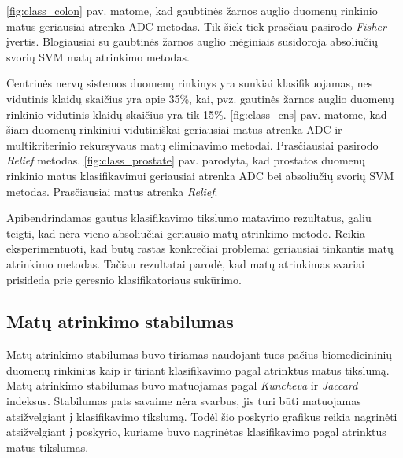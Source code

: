 \ref{fig:class_colon} pav. matome, kad gaubtinės žarnos auglio duomenų rinkinio matus geriausiai atrenka ADC metodas. Tik šiek tiek prasčiau pasirodo \textit{Fisher} įvertis. Blogiausiai su gaubtinės žarnos auglio mėginiais susidoroja absoliučių svorių SVM matų atrinkimo metodas.

Centrinės nervų sistemos duomenų rinkinys yra sunkiai klasifikuojamas, nes vidutinis klaidų skaičius yra apie 35\%, kai, pvz. gautinės žarnos auglio duomenų rinkinio vidutinis klaidų skaičius yra tik 15\%. \ref{fig:class_cns} pav. matome, kad šiam duomenų rinkiniui vidutiniškai geriausiai matus atrenka ADC ir multikriterinio rekursyvaus matų eliminavimo metodai. Prasčiausiai pasirodo \textit{Relief} metodas.
\ref{fig:class_prostate} pav. parodyta, kad prostatos duomenų rinkinio matus klasifikavimui geriausiai atrenka ADC bei absoliučių svorių SVM metodas. Prasčiausiai matus atrenka \textit{Relief}.

Apibendrindamas gautus klasifikavimo tikslumo matavimo rezultatus, galiu teigti, kad nėra vieno absoliučiai geriausio matų atrinkimo metodo. Reikia eksperimentuoti, kad būtų rastas konkrečiai problemai geriausiai tinkantis matų atrinkimo metodas. Tačiau rezultatai parodė, kad matų atrinkimas svariai prisideda prie geresnio klasifikatoriaus sukūrimo.

\subsection{Matų atrinkimo stabilumas}

Matų atrinkimo stabilumas buvo tiriamas naudojant tuos pačius biomedicininių duomenų rinkinius kaip ir tiriant klasifikavimo pagal atrinktus matus tikslumą. Matų atrinkimo stabilumas buvo matuojamas pagal \textit{Kuncheva} ir \textit{Jaccard} indeksus. Stabilumas pats savaime nėra svarbus, jis turi būti matuojamas atsižvelgiant į klasifikavimo tikslumą. Todėl šio poskyrio grafikus reikia nagrinėti atsižvelgiant į poskyrio, kuriame buvo nagrinėtas klasifikavimo pagal atrinktus matus tikslumas.

